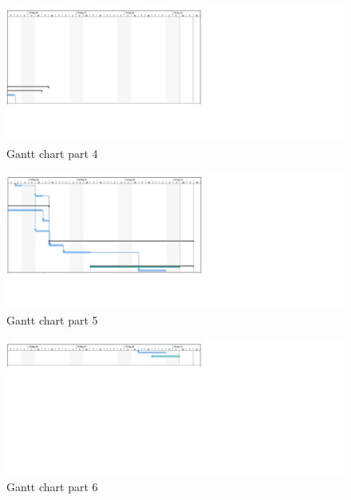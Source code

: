 \documentclass[10pt,onecolumn]{MainDocument}
\begin{document}
\begin{center}
\begin{figure}[h]
\centering
\includegraphics[trim = {0 0cm  14cm 0cm},clip, scale=0.58]{gantt4}
\caption{Gantt chart part 4}
\end{figure}
\end{center}

\newpage

\begin{center}
\begin{figure}[h]
\centering
\includegraphics[trim = {0 2cm 14cm 0cm},clip, scale=0.58]{gantt5}
\caption{Gantt chart part 5}
\end{figure}
\end{center}

\newpage

\begin{center}
\begin{figure}[h]
\centering
\includegraphics[trim = {0 11cm 14cm 0},clip, scale=0.58]{gantt6}
\caption{Gantt chart part 6}
\end{figure}
\end{center}
\end{document}
